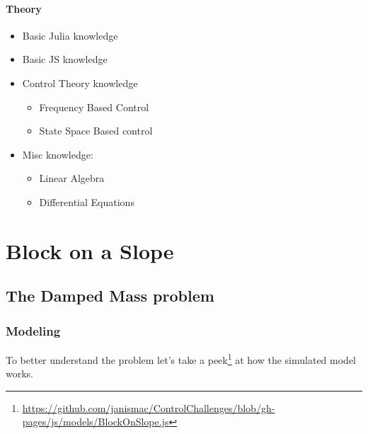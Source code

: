 \documentclass[
  a4paper,
  DIV=11,
  numbers=noendperiod]{scrreprt}
\DeclareRobustCommand{\href}[2]{#2\footnote{\url{#1}}}
\begin{document}
\subsection{Theory}\label{theory}

\begin{itemize}
\item
  Basic Julia knowledge
\item
  Basic JS knowledge
\item
  Control Theory knowledge

  \begin{itemize}
  \item
    Frequency Based Control
  \item
    State Space Based control
  \end{itemize}
\item
  Misc knowledge:

  \begin{itemize}
  \item
    Linear Algebra
  \item
    Differential Equations
  \end{itemize}
\end{itemize}

\part{Block on a Slope}

\chapter{The Damped Mass problem}\label{the-damped-mass-problem}

\section{Modeling}\label{modeling}

To better understand the problem let's take a
\href{https://github.com/janismac/ControlChallenges/blob/gh-pages/js/models/BlockOnSlope.js}{peek}
at how the simulated model works.
\end{document}
